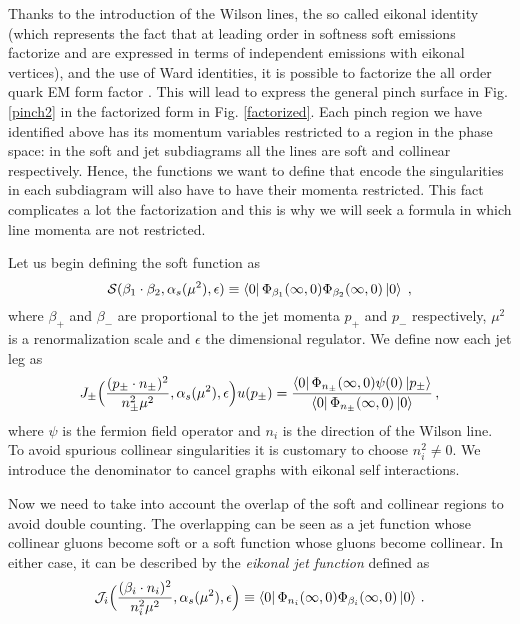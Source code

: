 \documentclass[%
 reprint,
 amsmath,amssymb,
 aps,
]{revtex4-1}
\begin{document}
Thanks to the introduction of the Wilson lines, the so called eikonal identity (which represents the fact that at leading order in softness soft emissions factorize and are expressed in terms of independent emissions with eikonal vertices), and the use of Ward identities, it is possible to factorize the all order quark EM form factor \cite{Collins}. This will lead to express the general pinch surface in Fig. \ref{pinch2} in the factorized form in Fig. \ref{factorized}.
Each pinch region we have identified above has its momentum variables restricted to a region in the phase space: in the soft and jet subdiagrams all the lines are soft and collinear respectively. Hence, the functions we want to define that encode the singularities in each subdiagram will also have to have their momenta restricted. This fact complicates a lot the factorization and this is why we will seek a formula in which line momenta are not restricted.\par
Let us begin defining the soft function as
\begin{equation}
\mathcal{S}(\beta_1\cdot \beta_2,\alpha_s(\mu^2),\epsilon)\equiv\bra{0} \Phi_{\beta_1}(\infty,0) \Phi_{\beta_2}(\infty,0)\ket{0}\;,\label{softf}
\end{equation}
where $\beta_+$ and $\beta_-$ are proportional to the jet momenta $p_+$ and $p_-$ respectively, $\mu^2$ is a renormalization scale and $\epsilon$ the dimensional regulator. We define now each jet leg as
\begin{equation}
J_\pm\Big(\frac{(p_\pm\cdot n_\pm)^2}{n_\pm^2\mu^2},\alpha_s(\mu^2),\epsilon\Big)u(p_\pm)=\frac{\bra{0} \Phi_{n_\pm}(\infty,0) \psi(0)\ket{p_\pm}}{\bra{0} \Phi_{n_
\pm}(\infty,0)\ket{0}}\,,\label{JET}
\end{equation}
where $\psi$ is the fermion field operator and $n_i$ is the direction of the Wilson line. To avoid spurious collinear singularities it is customary to choose $n_i^2\neq 0$. We introduce the denominator to cancel graphs with eikonal self interactions.\par
Now we need to take into account the overlap of the soft and collinear regions to avoid double counting. The overlapping can be seen as a jet function whose collinear gluons become soft or a soft function whose gluons become collinear. In either case, it can be described by the \textit{eikonal jet function} defined as
\begin{equation}
\mathcal{J}_i\Big(\frac{(\beta_i\cdot n_i)^2}{n_i^2\mu^2},\alpha_s(\mu^2),\epsilon\Big)\equiv\bra{0} \Phi_{n_i}(\infty,0) \Phi_{\beta_i}(\infty,0)\ket{0}\,.
\end{equation}
\end{document}
